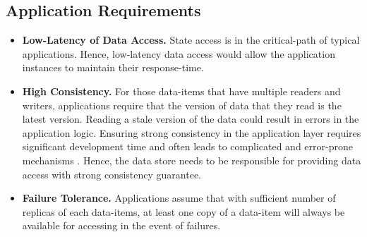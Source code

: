 \subsection{Application Requirements}
\begin{itemize}
\item \textbf{Low-Latency of Data Access. } State access is in the critical-path of typical applications. Hence, low-latency data access would allow the application instances to maintain their response-time.
\item \textbf{High Consistency. } For those data-items that have multiple readers and writers, applications require that the version of data that they read is the latest version. Reading a stale version of the data could result in errors in the application logic. Ensuring strong consistency in the application layer requires significant development time and often leads to complicated and error-prone mechanisms \cite{shute2013f1}. Hence, the data store needs to be responsible for providing data access with strong consistency guarantee.
\item \textbf{Failure Tolerance. } Applications assume that with sufficient number of replicas of each data-items, at least one copy of a data-item will always be available for accessing in the event of failures.
\end{itemize}

